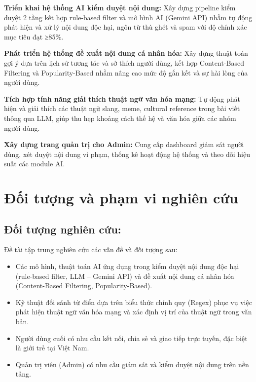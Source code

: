 \textbf{Triển khai hệ thống AI kiểm duyệt nội dung:} Xây dựng pipeline
kiểm duyệt 2 tầng kết hợp rule-based filter và mô hình AI (Gemini API)
nhằm tự động phát hiện và xử lý nội dung độc hại, ngôn từ thù ghét và
spam với độ chính xác mục tiêu đạt ≥85\%.

\textbf{Phát triển hệ thống đề xuất nội dung cá nhân hóa:} Xây dựng
thuật toán gợi ý dựa trên lịch sử tương tác và sở thích người dùng, kết
hợp Content-Based Filtering và Popularity-Based nhằm nâng cao mức độ gắn
kết và sự hài lòng của người dùng.

\textbf{Tích hợp tính năng giải thích thuật ngữ văn hóa mạng:} Tự động phát hiện và giải
thích các thuật ngữ slang, meme, cultural reference trong bài viết thông
qua LLM, giúp thu hẹp khoảng cách thế hệ và văn hóa giữa các nhóm người
dùng.

\textbf{Xây dựng trang quản trị cho Admin:} Cung cấp dashboard giám sát
người dùng, xét duyệt nội dung vi phạm, thống kê hoạt động hệ thống và
theo dõi hiệu suất các module AI.

\section{Đối tượng và phạm vi nghiên
cứu}\label{ux111ux1ed1i-tux1b0ux1ee3ng-vuxe0-phux1ea1m-vi-nghiuxean-cux1ee9u}

\subsection{Đối tượng nghiên
cứu:}\label{ux111ux1ed1i-tux1b0ux1ee3ng-nghiuxean-cux1ee9u}

Đề tài tập trung nghiên cứu các vấn đề và đối tượng sau:

\begin{itemize}
\item
  Các mô hình, thuật toán AI ứng dụng trong kiểm duyệt nội dung độc hại
  (rule-based filter, LLM -- Gemini API) và đề xuất nội dung cá nhân hóa
  (Content-Based Filtering, Popularity-Based).
\item
  Kỹ thuật đối sánh từ điển dựa trên biểu thức chính quy (Regex) phục vụ
  việc phát hiện thuật ngữ văn hóa mạng và xác định vị trí của thuật ngữ
  trong văn bản.
\item
  Người dùng cuối có nhu cầu kết nối, chia sẻ và giao tiếp trực tuyến,
  đặc biệt là giới trẻ tại Việt Nam.
\item
  Quản trị viên (Admin) có nhu cầu giám sát và kiểm duyệt nội dung trên
  nền tảng.
\end{itemize}

